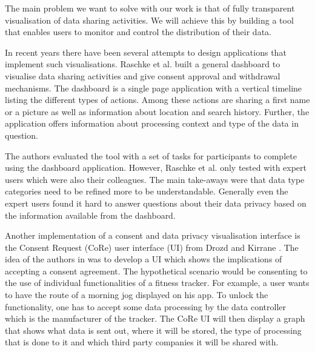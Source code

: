 
  The main problem we want to solve with our work is that of fully transparent visualisation of data sharing activities. We will achieve this by building a tool that enables users to monitor and control the distribution of their data. 
  
  In recent years there have been several attempts to design applications that implement such visualisations. Raschke et al. \cite{core_privacy_dashboard_2018} built a general dashboard to visualise data sharing activities and give consent approval and withdrawal mechanisms. The dashboard is a single page application with a vertical timeline listing the different types of actions. Among these actions are
  sharing a first name or a picture as well as information about location and search history. Further, the application offers information about processing context and type of the data in question.
  
  The authors evaluated the tool with a set of tasks for participants to complete using the dashboard application. However, Raschke et al. \cite{core_privacy_dashboard_2018} only tested with expert users which were also their colleagues. The main take-aways were that data type categories need to be refined more to be understandable. Generally even the expert users found it hard to answer questions about their data privacy based on the information available from the dashboard.
  
  Another implementation of a consent and data privacy visualisation interface is the Consent Request (CoRe) user interface (UI) from Drozd and Kirrane \cite{cure2020}.
  The idea of the authors in \cite{cure2020} was to develop a UI which shows the implications of accepting a consent agreement. The hypothetical scenario would be consenting to the use of individual functionalities of a fitness tracker. For example, a user wants to have the route of a morning jog displayed on his app. To unlock the functionality, one has to accept some data processing by the data controller which is the manufacturer of the tracker. The CoRe UI \cite{cure2020} will then display a graph that shows what data is sent out, where it will be stored, the type of processing that is done to it and which third party companies it will be shared with.
  
